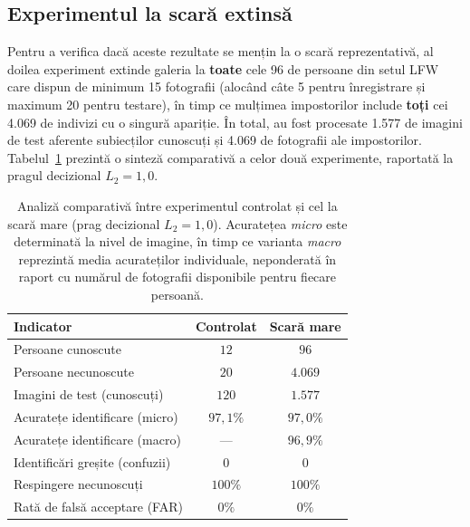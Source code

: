 \documentclass[../../main.tex]{subfiles}
\begin{document}
\subsection{Experimentul la scară extinsă}
\label{subsec:facial_scara_mare}

Pentru a verifica dacă aceste rezultate se mențin la o scară reprezentativă, al doilea experiment extinde galeria la \textbf{toate} cele 96 de persoane din setul LFW care dispun de minimum 15 fotografii (alocând câte 5 pentru înregistrare și maximum 20 pentru testare), în timp ce mulțimea impostorilor include \textbf{toți} cei 4.069 de indivizi cu o singură apariție. În total, au fost procesate 1.577 de imagini de test aferente subiecților cunoscuți și 4.069 de fotografii ale impostorilor. Tabelul~\ref{tab:facial_comparativ} prezintă o sinteză comparativă a celor două experimente, raportată la pragul decizional $L_2 = 1{,}0$.

\begin{table}[h]
    \centering
    \caption{Analiză comparativă între experimentul controlat și cel la scară mare (prag decizional $L_2 = 1{,}0$). Acuratețea \textit{micro} este determinată la nivel de imagine, în timp ce varianta \textit{macro} reprezintă media acurateților individuale, neponderată în raport cu numărul de fotografii disponibile pentru fiecare persoană.}
    \label{tab:facial_comparativ}
    \begin{tabular}{l c c}
        \hline
        \textbf{Indicator} & \textbf{Controlat} & \textbf{Scară mare} \\
        \hline
        Persoane cunoscute            & $12$    & $96$    \\
        Persoane necunoscute          & $20$    & $4.069$ \\
        Imagini de test (cunoscuți)   & $120$   & $1.577$ \\
        Acuratețe identificare (micro) & $97{,}1\%$ & $97{,}0\%$ \\
        Acuratețe identificare (macro) & ---     & $96{,}9\%$ \\
        Identificări greșite (confuzii) & $0$    & $0$     \\
        Respingere necunoscuți        & $100\%$ & $100\%$ \\
        Rată de falsă acceptare (FAR) & $0\%$   & $0\%$   \\
        \hline
    \end{tabular}
\end{table}
\end{document}
